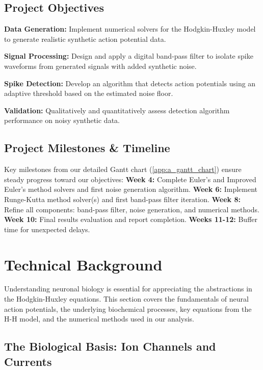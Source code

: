 \documentclass{article} %
\begin{document}
\begin{multicols}{2}
\subsection{Project Objectives}
\label{subsec:project_objectives}

\textbf{Data Generation:} Implement numerical solvers for the Hodgkin-Huxley model to generate realistic synthetic action potential data.

\textbf{Signal Processing:} Design and apply a digital band-pass filter to isolate spike waveforms from generated signals with added synthetic noise.

\textbf{Spike Detection:} Develop an algorithm that detects action potentials using an adaptive threshold based on the estimated noise floor.

\textbf{Validation:} Qualitatively and quantitatively assess detection algorithm performance on noisy synthetic data.

\subsection{Project Milestones \& Timeline}
\label{subsec:milestones_timeline}

Key milestones from our detailed Gantt chart (\ref{app:a_gantt_chart}) ensure steady progress toward our objectives: \textbf{Week 4:} Complete Euler's and Improved Euler's method solvers and first noise generation algorithm.
\textbf{Week 6:} Implement Runge-Kutta method solver(s) and first band-pass filter iteration.
\textbf{Week 8:} Refine all components: band-pass filter, noise generation, and numerical methods.
\textbf{Week 10:} Final results evaluation and report completion.
\textbf{Weeks 11-12:} Buffer time for unexpected delays.
\section{Technical Background}
\label{sec:technical_background}

Understanding neuronal biology is essential for appreciating the abstractions in the Hodgkin-Huxley equations. 
This section covers the fundamentals of neural action potentials, the underlying biochemical processes, key equations from the H-H model, and the numerical methods used in our analysis.

\subsection{The Biological Basis: Ion Channels and Currents}
\label{subsec:biological_basis}


\end{multicols}
\end{document}
